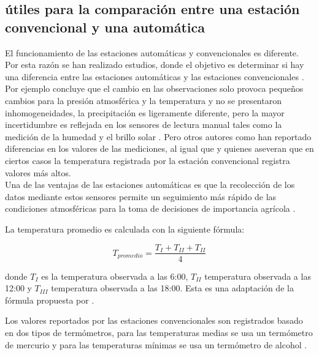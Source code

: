 \documentclass[11pt]{article}
\begin{document}


\subsection{útiles para la comparación entre una estación convencional y una automática}

El funcionamiento de las estaciones automáticas y convencionales es diferente. Por esta razón se han realizado estudios, donde el objetivo es determinar si hay una diferencia entre las estaciones automáticas y las estaciones convencionales \citep{auchmann2012physics}. Por ejemplo \citet{augter2013vergleich} concluye que el cambio en las observaciones solo provoca pequeños cambios para la presión atmosférica y la temperatura y no se presentaron inhomogeneidades, la precipitación es ligeramente diferente, pero la mayor incertidumbre es reflejada en los sensores de lectura manual tales como la medición de la humedad y el brillo solar \citep{augter2013vergleich}. Pero otros autores como \citet{kamtz1831lehrbuch} han reportado diferencias en los valores de las mediciones, al igual que \citet{lacombe2010results} y \citep{kaspar2016climate} quienes aseveran que en ciertos casos la temperatura registrada por la estación convencional registra valores más altos.\\

Una de las ventajas de las estaciones automáticas es que la recolección de los datos mediante estos sensores permite un seguimiento más rápido de las condiciones atmosféricas para la toma de decisiones de importancia agrícola \citep{Soares2017}.

La temperatura promedio es calculada con la siguiente fórmula:

\begin{equation}\label{fx:promedio}
T_{promedio} = \frac{T_{I} + T_{II} +T_{II}}{4}
\end{equation}

donde $T_{I}$ es la temperatura observada a las 6:00, $T_{II}$ temperatura observada a las 12:00 y $T_{III}$ temperatura observada a las 18:00. Esta es una adaptación de la fórmula propuesta por \citet{kamtz1831lehrbuch}.

Los valores reportados por las estaciones convencionales son registrados basado en dos tipos de termómetros, para las temperaturas medias se usa un termómetro de mercurio y para las temperaturas mínimas se usa un termómetro de alcohol \citep{augter2013vergleich}. 
\end{document}
